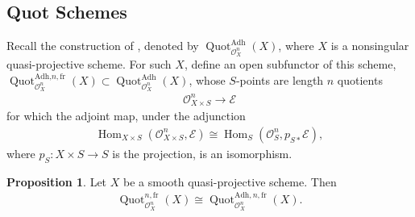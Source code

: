 \documentclass{article}
\numberwithin{equation}{section}
\theoremstyle{quest}
\theoremstyle{definition}
\newtheorem{prop}[thm]{Proposition}
\theoremstyle{remark}
\DeclareMathOperator{\Hom}{Hom}
\DeclareMathOperator{\Quot}{Quot}
\begin{document}
\subsection{Quot Schemes}
Recall the construction of \cite[Definition 3.3]{quot}, denoted by $\Quot ^{\text{Adh}}_{\mathscr{O}_X^n}(X)$, where $X$ is a nonsingular quasi-projective scheme. For such $X$, define an open subfunctor of this scheme, $\Quot ^{\text{Adh,}n,\text{fr}}_{\mathscr{O}^n_X}(X)\subset \Quot ^{\text{Adh}}_{\mathscr{O}^n_X}(X)$, whose $S$-points are length $n$ quotients
\begin{align*}
	\mathscr{O}^n_{X\times S}\to \mathscr{E}
\end{align*} 
for which the adjoint map, under the adjunction 
	\begin{align*}
		\Hom_{X\times S}(\mathscr{O}^n_{X\times S},\mathscr{E})\cong\Hom_S(\mathscr{O}^n_S,p_{S*}\mathscr{E}),
	\end{align*} 
	where $p_S:X\times S\to S$ is the projection, is an isomorphism.
	\begin{prop}\label{prop:matchup-with-adhikari}
	Let $X$ be a smooth quasi-projective scheme. Then 
	\begin{align*}
		\Quot^{n,\text{fr}}_{\mathscr{O}_X^n}(X)\cong\Quot ^{\text{Adh},n,\text{fr}}_{\mathscr{O}^n_X}(X).
	\end{align*} 
\end{prop} 
\end{document}
